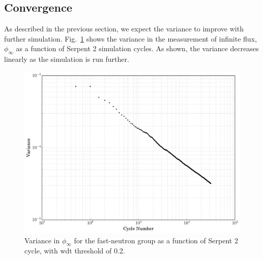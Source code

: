 \subsection{Convergence}
\label{sec:convergence}

As described in the previous section, we expect the variance to
improve with further simulation. Fig.~\ref{fig:error_convergence}
shows the variance in the measurement of infinite flux,
$\phi_{\infty}$ as a function of Serpent 2 simulation cycles. As
shown, the variance decreases linearly as the simulation is run
further.
\begin{figure}[hbtp]
  \centering
  \includegraphics[scale=0.4]{images/error_convergence}
  \caption[Variance in $\phi_{\infty}$ for the fast-neutron group as a
    function of Serpent 2 cycle.]{Variance in $\phi_{\infty}$ for the fast-neutron group as a
    function of Serpent 2 cycle, with \gls{wdt} threshold of 0.2.}
  \label{fig:error_convergence}
\end{figure}

